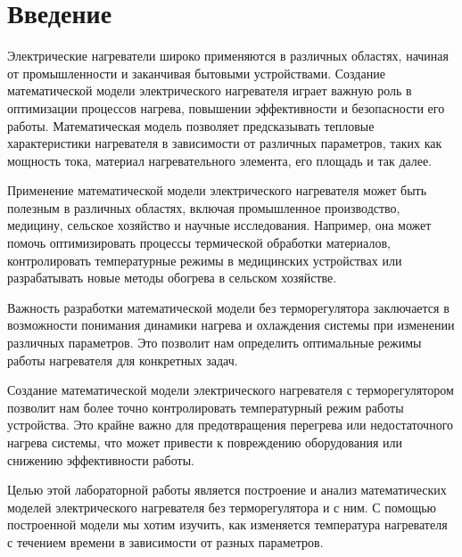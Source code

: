 \pagebreak

\section{Введение}
    Электрические нагреватели широко применяются в различных областях, начиная от промышленности и заканчивая бытовыми устройствами. Создание математической модели электрического нагревателя играет важную роль в оптимизации процессов нагрева, повышении эффективности и безопасности его работы. Математическая модель позволяет предсказывать тепловые характеристики нагревателя в зависимости от различных параметров, таких как мощность тока, материал нагревательного элемента, его площадь и так далее.

	Применение математической модели электрического нагревателя может быть полезным в различных областях, включая промышленное производство, медицину, сельское хозяйство и научные исследования. Например, она может помочь оптимизировать процессы термической обработки материалов, контролировать температурные режимы в медицинских устройствах или разрабатывать новые методы обогрева в сельском хозяйстве.

	Важность разработки математической модели без терморегулятора заключается в возможности понимания динамики нагрева и охлаждения системы при изменении различных параметров. Это позволит нам определить оптимальные режимы работы нагревателя для конкретных задач.

	Создание математической модели электрического нагревателя с терморегулятором позволит нам более точно контролировать температурный режим работы устройства. Это крайне важно для предотвращения перегрева или недостаточного нагрева системы, что может привести к повреждению оборудования или снижению эффективности работы.

	Целью этой лабораторной работы является построение и анализ математических моделей электрического нагревателя без терморегулятора и с ним. С помощью построенной модели мы хотим изучить, как изменяется температура нагревателя с течением времени в зависимости от разных параметров.

\pagebreak